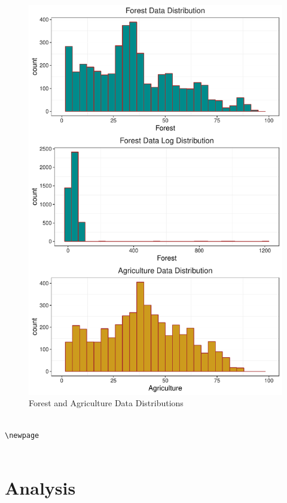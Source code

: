 \documentclass[12pt,]{article}
\begin{document}
\begin{figure}
\centering
\includegraphics{Marx_ENV872_Project_files/figure-latex/unnamed-chunk-4-1.pdf}
\caption{\label{fig:fig3}Forest and Agriculture Data Distributions}
\end{figure}

\begin{verbatim}

\newpage
 
\end{verbatim}

\section{Analysis}\label{analysis}
\end{document}
